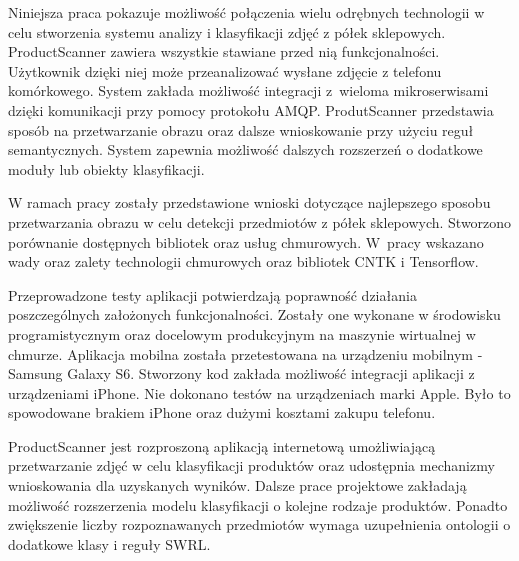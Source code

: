 Niniejsza praca pokazuje możliwość połączenia wielu odrębnych technologii w celu stworzenia systemu analizy i klasyfikacji zdjęć z półek sklepowych. ProductScanner zawiera wszystkie stawiane przed nią funkcjonalności. Użytkownik dzięki niej może przeanalizować wysłane zdjęcie z telefonu komórkowego. System zakłada możliwość integracji z~wieloma mikroserwisami dzięki komunikacji przy pomocy protokołu AMQP. ProdutScanner przedstawia sposób na przetwarzanie obrazu oraz dalsze wnioskowanie przy użyciu reguł semantycznych. System zapewnia możliwość dalszych rozszerzeń o dodatkowe moduły lub obiekty klasyfikacji. 

W ramach pracy zostały przedstawione wnioski dotyczące najlepszego sposobu przetwarzania obrazu w celu detekcji przedmiotów z półek sklepowych. Stworzono porównanie dostępnych bibliotek oraz usług chmurowych. W~pracy wskazano wady oraz zalety technologii chmurowych oraz bibliotek CNTK i Tensorflow. 

Przeprowadzone testy aplikacji potwierdzają poprawność działania poszczególnych założonych funkcjonalności. Zostały one wykonane w środowisku programistycznym oraz docelowym produkcyjnym na maszynie wirtualnej w chmurze. Aplikacja mobilna została przetestowana na urządzeniu mobilnym - Samsung Galaxy S6. Stworzony kod zakłada możliwość integracji aplikacji z urządzeniami iPhone. Nie dokonano testów na urządzeniach marki Apple. Było to spowodowane brakiem iPhone oraz dużymi kosztami zakupu telefonu.

ProductScanner jest rozproszoną aplikacją internetową umożliwiającą przetwarzanie zdjęć w celu klasyfikacji produktów oraz udostępnia mechanizmy wnioskowania dla uzyskanych wyników. Dalsze prace projektowe zakładają możliwość rozszerzenia modelu klasyfikacji o kolejne rodzaje produktów. Ponadto zwiększenie liczby rozpoznawanych przedmiotów wymaga uzupełnienia ontologii o dodatkowe klasy i reguły SWRL.